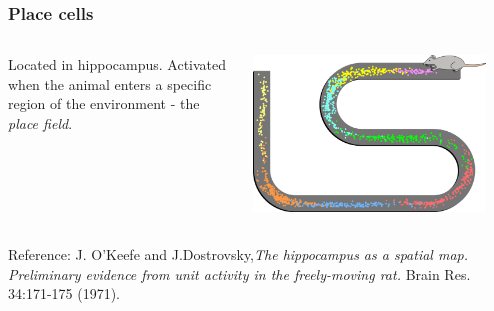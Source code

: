 \documentclass[mathserif]{beamer}
\begin{document}
%
%
%
\begin{frame}
\frametitle{Place cells}
  \begin{columns}[T]
    \begin{column}{.5\textwidth}
			Located in hippocampus. Activated when the animal enters a specific region of the environment - the \textit{place field}.
    \end{column}
    \begin{column}{.5\textwidth}
    \includegraphics[width=0.9\textwidth]{Place_Cell_Spiking_Activity_Example.png}
    \end{column}
  \end{columns}	

  {\small Reference: \newline
  J. O'Keefe and J.Dostrovsky,\textit{The hippocampus as a spatial map. Preliminary evidence from unit activity in the freely-moving rat.} Brain Res. 34:171-175 (1971). }
\end{frame}
%
%
%
\end{document}
